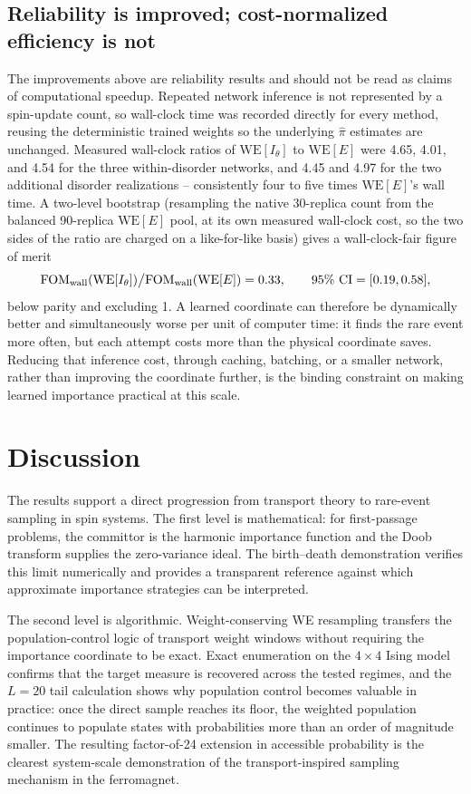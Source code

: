 \documentclass[a4paper,fleqn]{cas-sc}
\newcommand{\FOM}{\mathrm{FOM}}
\newcommand{\WE}{\mathrm{WE}}
\begin{document}
\subsection{Reliability is improved; cost-normalized efficiency is not}\label{sec:costdisc}
The improvements above are reliability results and should not be read as claims of computational speedup. Repeated network inference is not represented by a spin-update count, so wall-clock time was recorded directly for every method, reusing the deterministic trained weights so the underlying $\hat\pi$ estimates are unchanged. Measured wall-clock ratios of $\WE[I_\theta]$ to $\WE[E]$ were 4.65, 4.01, and 4.54 for the three within-disorder networks, and 4.45 and 4.97 for the two additional disorder realizations -- consistently four to five times $\WE[E]$'s wall time. A two-level bootstrap (resampling the native 30-replica count from the balanced 90-replica $\WE[E]$ pool, at its own measured wall-clock cost, so the two sides of the ratio are charged on a like-for-like basis) gives a wall-clock-fair figure of merit
\begin{equation}
\FOM_{\rm wall}(\WE[I_\theta])\big/\FOM_{\rm wall}(\WE[E]) = 0.33,
\qquad 95\%\ \mathrm{CI}=[0.19,0.58],
\end{equation}
below parity and excluding 1. A learned coordinate can therefore be dynamically better and simultaneously worse per unit of computer time: it finds the rare event more often, but each attempt costs more than the physical coordinate saves. Reducing that inference cost, through caching, batching, or a smaller network, rather than improving the coordinate further, is the binding constraint on making learned importance practical at this scale.

\section{Discussion}
The results support a direct progression from transport theory to rare-event sampling in spin systems. The first level is mathematical: for first-passage problems, the committor is the harmonic importance function and the Doob transform supplies the zero-variance ideal. The birth--death demonstration verifies this limit numerically and provides a transparent reference against which approximate importance strategies can be interpreted.

The second level is algorithmic. Weight-conserving WE resampling transfers the population-control logic of transport weight windows without requiring the importance coordinate to be exact. Exact enumeration on the $4\times4$ Ising model confirms that the target measure is recovered across the tested regimes, and the $L=20$ tail calculation shows why population control becomes valuable in practice: once the direct sample reaches its floor, the weighted population continues to populate states with probabilities more than an order of magnitude smaller. The resulting factor-of-24 extension in accessible probability is the clearest system-scale demonstration of the transport-inspired sampling mechanism in the ferromagnet.
\end{document}
